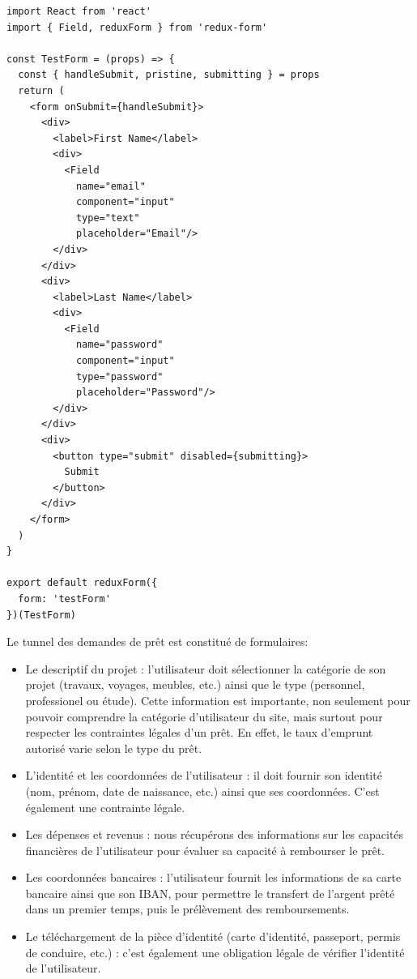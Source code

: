 \begin{verbatim}
import React from 'react'
import { Field, reduxForm } from 'redux-form'

const TestForm = (props) => {
  const { handleSubmit, pristine, submitting } = props
  return (
    <form onSubmit={handleSubmit}>
      <div>
        <label>First Name</label>
        <div>
          <Field
            name="email"
            component="input"
            type="text"
            placeholder="Email"/>
        </div>
      </div>
      <div>
        <label>Last Name</label>
        <div>
          <Field
            name="password"
            component="input"
            type="password"
            placeholder="Password"/>
        </div>
      </div>
      <div>
        <button type="submit" disabled={submitting}>
          Submit
        </button>
      </div>
    </form>
  )
}

export default reduxForm({
  form: 'testForm'
})(TestForm)
\end{verbatim}

\bigskip

Le tunnel des demandes de prêt est constitué de formulaires:

\begin{itemize}
\tightlist
\item
  Le descriptif du projet : l'utilisateur doit sélectionner la catégorie
  de son projet (travaux, voyages, meubles, etc.) ainsi que le type
  (personnel, professionel ou étude). Cette information est importante,
  non seulement pour pouvoir comprendre la catégorie d'utilisateur du
  site, mais surtout pour respecter les contraintes légales d'un prêt.
  En effet, le taux d'emprunt autorisé varie selon le type du prêt.
\item
  L'identité et les coordonnées de l'utilisateur : il doit fournir son
  identité (nom, prénom, date de naissance, etc.) ainsi que ses
  coordonnées. C'est également une contrainte légale.
\item
  Les dépenses et revenus : nous récupérons des informations sur les
  capacités financières de l'utilisateur pour évaluer sa capacité à
  rembourser le prêt.
\item
  Les coordonnées bancaires : l'utilisateur fournit les informations de
  sa carte bancaire ainsi que son IBAN, pour permettre le transfert de
  l'argent prêté dans un premier temps, puis le prélèvement des
  remboursements.
\item
  Le téléchargement de la pièce d'identité (carte d'identité, passeport,
  permis de conduire, etc.) : c'est également une obligation légale de
  vérifier l'identité de l'utilisateur.
\end{itemize}

